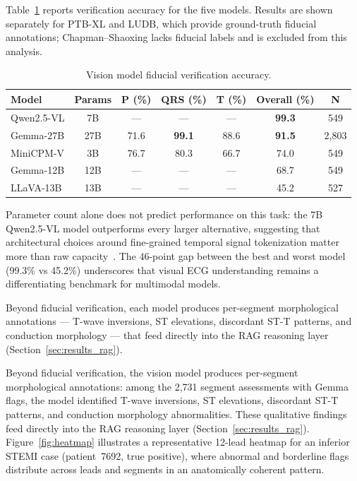 \documentclass[journal,compsoc]{IEEEtran}
\begin{document}
Table~\ref{tab:vision} reports verification accuracy for the five models. Results are shown separately for PTB-XL and LUDB, which provide ground-truth fiducial annotations; Chapman--Shaoxing lacks fiducial labels and is excluded from this analysis.
\begin{table}[t]
\centering
\caption{Vision model fiducial verification accuracy.}
\label{tab:vision}
\begin{tabular}{lcccccc}
\toprule
Model & Params & P (\%) & QRS (\%) & T (\%) & Overall (\%) & N \\
\midrule
Qwen2.5-VL & 7B & --- & --- & --- & \textbf{99.3} & 549 \\
Gemma-27B & 27B & 71.6 & \textbf{99.1} & 88.6 & \textbf{91.5} & 2{,}803 \\
MiniCPM-V & 3B & 76.7 & 80.3 & 66.7 & 74.0 & 549 \\
Gemma-12B & 12B & --- & --- & --- & 68.7 & 549 \\
LLaVA-13B & 13B & --- & --- & --- & 45.2 & 527 \\
\bottomrule
\end{tabular}
\end{table}

Parameter count alone does not predict performance on this task: the 7B Qwen2.5-VL model outperforms every larger alternative, suggesting that architectural choices around fine-grained temporal signal tokenization matter more than raw capacity~\cite{li2026pulse,gem_ecg_2025}. The 46-point gap between the best and worst model (99.3\% vs 45.2\%) underscores that visual ECG understanding remains a differentiating benchmark for multimodal models.

Beyond fiducial verification, each model produces per-segment morphological annotations --- T-wave inversions, ST elevations, discordant ST-T patterns, and conduction morphology --- that feed directly into the RAG reasoning layer (Section~\ref{sec:results_rag}).

Beyond fiducial verification, the vision model produces per-segment morphological annotations: among the 2,731 segment assessments with Gemma flags, the model identified T-wave inversions, ST elevations, discordant ST-T patterns, and conduction morphology abnormalities. These qualitative findings feed directly into the RAG reasoning layer (Section~\ref{sec:results_rag}). Figure~\ref{fig:heatmap} illustrates a representative 12-lead heatmap for an inferior STEMI case (patient~7692, true positive), where abnormal and borderline flags distribute across leads and segments in an anatomically coherent pattern.
\end{document}
